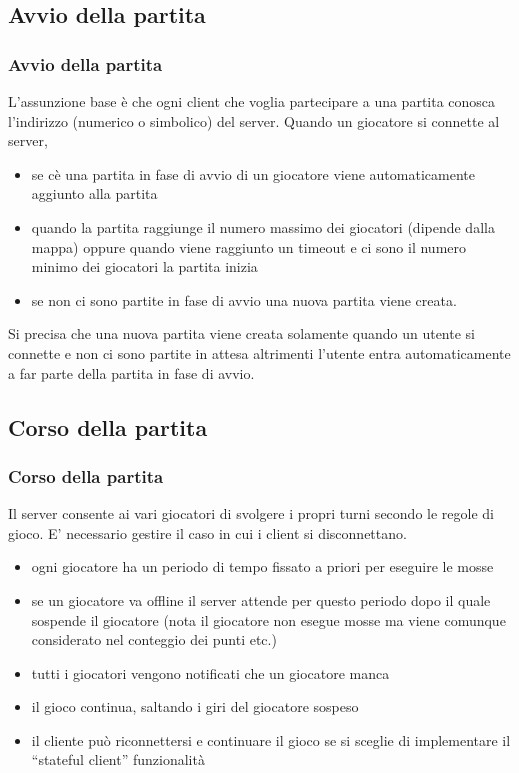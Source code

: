 \documentclass{beamer}
\begin{document}
\subsection{Avvio della partita}
\begin{frame}
\frametitle{Avvio della partita}
L'assunzione base \`e che ogni client che voglia partecipare a una partita conosca l'indirizzo (numerico o simbolico) del server. Quando un giocatore si connette al server, 
\begin{itemize}
\item se c\`e una partita in fase di avvio di un giocatore viene
  automaticamente aggiunto alla partita
\item quando la partita raggiunge il numero massimo dei giocatori
  (dipende dalla mappa) oppure quando viene raggiunto un timeout  e ci
  sono il numero minimo dei giocatori la partita inizia 
\item se non ci sono partite in fase di avvio una nuova partita viene
  creata.
\end{itemize}
Si precisa che una nuova partita viene creata solamente quando un
utente si connette e non ci sono partite in attesa altrimenti l'utente
entra automaticamente a far parte della partita in fase di avvio.
\end{frame}

\subsection{Corso della partita}
\begin{frame}
\frametitle{Corso della partita}
Il server consente ai vari giocatori di svolgere i propri turni
secondo le regole di gioco. E' necessario gestire il caso in cui i
client si disconnettano.
\begin{itemize}
\item ogni giocatore ha un periodo di tempo fissato a priori per  eseguire le mosse 
\item se un giocatore va offline il server attende per questo periodo
  dopo il quale sospende il giocatore (nota il giocatore non esegue
  mosse ma viene comunque considerato nel conteggio dei punti etc.) 
\item tutti i giocatori vengono notificati che un giocatore manca
\item il gioco continua, saltando i giri del giocatore sospeso
\item il cliente può riconnettersi e continuare il gioco se si sceglie
  di implementare il ``stateful client'' funzionalit\`a 
\end{itemize}
\end{frame}
\end{document}

